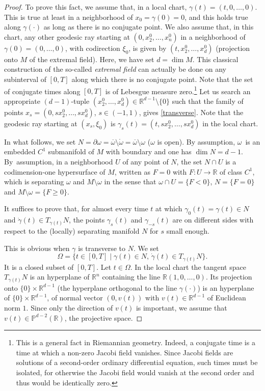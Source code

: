 \documentclass[JEP,XML,SOM,Unicode, NoEqCountersInSection,NoFloatCountersInSection,published]{cedram}
\def\R{\mathbb{R}}
\theoremstyle{definition}
\begin{document}
\begin{proof}
To prove this fact, we assume that, in a local chart, $\gamma(t) = (t,0,\ldots,0)$. This is true at least in a neighborhood of $x_0=\gamma(0)=0$, and this holds true along $\gamma(\cdot)$ as long as there is no conjugate point. We also assume that, in this chart, any other geodesic ray starting at $(0,x_2^0,\ldots,x_n^0)$ in a neighborhood of $\gamma(0)=(0,\ldots,0)$, with codirection $\xi_0$, is given by $(t,x_2^0,\ldots,x_d^0)$ (projection onto $M$ of the extremal field). Here, we have set $d=\dim M$.
This classical construction of the so-called \emph{extremal field} can actually be done on any subinterval of $[0,T]$ along which there is no conjugate point.
Note that the set of conjugate times along $[0,T]$ is of Lebesgue measure zero.\footnote{This is a general fact in Riemannian geometry. Indeed, a conjugate time is a time at which a non-zero Jacobi field vanishes. Since Jacobi fields are solutions of a second-order ordinary differential equation, such times must be isolated, for otherwise the Jacobi field would vanish at the second order and thus would be identically zero.}
Let us search an appropriate $(d-1)$-tuple $(x_2^0,\ldots,x_d^0)\in\R^{d-1}\setminus\{0\}$ such that the family of points $x_s=(0,sx_2^0,\ldots,sx_d^0)$, $s\in(-1,1)$, gives \eqref{transverse}. Note that the geodesic ray starting at {$(x_s,\xi_0)$} is $\gamma_s(t) = (t,sx_2^0,\ldots,sx_d^0)$ in the local chart.

In what follows, we set $N=\partial\omega= \overline\omega \setminus \mathring{\omega} = \overline\omega \setminus \omega$ ($\omega$ is open).
By assumption, $\omega$~is an embedded $C^1$ submanifold of $M$ with boundary and one has $\dim N=d-1$. By~assumption, in a neighborhood $U$ of any point of $N$, the set $N\cap U$ is a codimension-one hypersurface of $M$, written as $F=0$ with $F:U\rightarrow\R$ of class $C^1$, which is separating $\omega$ and $M\setminus\omega$ in the sense that $\omega\cap U=\{F<0\}$, $N=\{F=0\}$ and $M\setminus\omega=\{F\geq 0\}$.

It suffices to prove that, for almost every time $t$ at which $\gamma_0(t)=\gamma(t)\in N$ and $\dot\gamma(t)\in T_{\gamma(t)}N$, the points $\gamma_s(t)$ and $\gamma_{-s}(t)$ are on different sides with respect to the (locally) separating manifold $N$ for $s$ small enough.

This is obvious when $\gamma$ is transverse to $N$.
We set
\[
\Omega=\{t\in[0,T] \mid \gamma(t)\in N,\, \dot\gamma(t)\in T_{\gamma(t)}N \}.
\]
It is a closed subset of $[0,T]$.
Let $t\in\Omega$. In the local chart the tangent space $T_{\gamma(t)}N$ is an hyperplane of $\R^n$ containing the line $\R(1,0,\ldots,0)$. Its projection onto $\{0\}\times\R^{d-1}$ (the hyperplane orthogonal to the line $\gamma(\cdot)$) is an hyperplane of $\{0\}\times\R^{d-1}$, of normal vector $(0,v(t))$ with $v(t)\in\R^{d-1}$ of Euclidean norm $1$. Since only the direction of $v(t)$ is important, we assume that $v(t)\in \mathbb{P}^{d-2}(\R)$, the projective space.


\end{proof}
\end{document}
